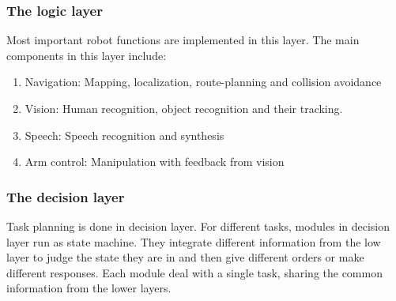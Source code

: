 \subsubsection{The logic layer}
Most important robot functions are implemented in this layer. The main components in this layer include:
\begin{enumerate}
    \item Navigation: Mapping, localization, route-planning and collision avoidance
    \item Vision: Human recognition, object recognition and their tracking.
    \item Speech: Speech recognition and synthesis
    \item Arm control: Manipulation with feedback from vision
\end{enumerate}

\subsubsection{The decision layer}
Task planning is done in decision layer. For different tasks, modules in decision layer run as state machine. They integrate different information from the low layer to judge the state they are in and then give different orders or make different responses. Each module deal with a single task, sharing the common information from the lower layers.


